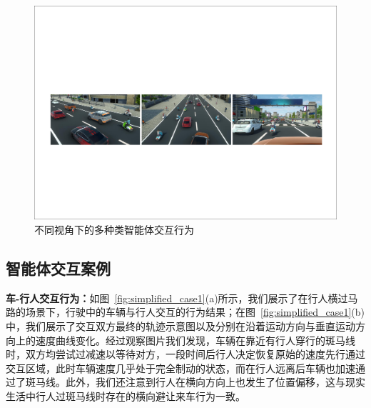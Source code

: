 \begin{figure}[tbh]
\centering
\includegraphics[width=\textwidth]{figure/simplified/simplified_snapshot}
\caption[不同视角下的多种类智能体交互行为]{
不同视角下的多种类智能体交互行为
}
\label{fig:simplified_snapshot2}
\end{figure}


\subsection{智能体交互案例}
\label{section:simplified_interactioncase}

\textbf{车-行人交互行为：}如图~\ref{fig:simplified_case1}(a)所示，我们展示了在行人横过马路的场景下，行驶中的车辆与行人交互的行为结果；在图~\ref{fig:simplified_case1}(b)中，我们展示了交互双方最终的轨迹示意图以及分别在沿着运动方向与垂直运动方向上的速度曲线变化。经过观察图片我们发现，车辆在靠近有行人穿行的斑马线时，双方均尝试过减速以等待对方，一段时间后行人决定恢复原始的速度先行通过交互区域，此时车辆速度几乎处于完全制动的状态，而在行人远离后车辆也加速通过了斑马线。此外，我们还注意到行人在横向方向上也发生了位置偏移，这与现实生活中行人过斑马线时存在的横向避让来车行为一致。

